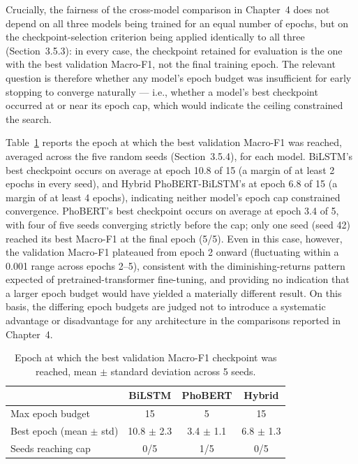 \documentclass[12pt]{report} %
\begin{document}
Crucially, the fairness of the cross-model comparison in Chapter~4 does not depend on all three models being trained for an equal number of epochs, but on the checkpoint-selection criterion being applied identically to all three (Section~3.5.3): in every case, the checkpoint retained for evaluation is the one with the best validation Macro-F1, not the final training epoch. The relevant question is therefore whether any model's epoch budget was insufficient for early stopping to converge naturally --- i.e., whether a model's best checkpoint occurred at or near its epoch cap, which would indicate the ceiling constrained the search.

Table~\ref{tab:epoch-convergence} reports the epoch at which the best validation Macro-F1 was reached, averaged across the five random seeds (Section~3.5.4), for each model. BiLSTM's best checkpoint occurs on average at epoch 10.8 of 15 (a margin of at least 2 epochs in every seed), and Hybrid PhoBERT-BiLSTM's at epoch 6.8 of 15 (a margin of at least 4 epochs), indicating neither model's epoch cap constrained convergence. PhoBERT's best checkpoint occurs on average at epoch 3.4 of 5, with four of five seeds converging strictly before the cap; only one seed (seed 42) reached its best Macro-F1 at the final epoch (5/5). Even in this case, however, the validation Macro-F1 plateaued from epoch 2 onward (fluctuating within a 0.001 range across epochs 2--5), consistent with the diminishing-returns pattern expected of pretrained-transformer fine-tuning, and providing no indication that a larger epoch budget would have yielded a materially different result. On this basis, the differing epoch budgets are judged not to introduce a systematic advantage or disadvantage for any architecture in the comparisons reported in Chapter~4.

\begin{table}[htbp]
    \centering
    \caption{Epoch at which the best validation Macro-F1 checkpoint was reached, mean $\pm$ standard deviation across 5 seeds.}
    \label{tab:epoch-convergence}
    \begin{tabular}{lccc}
        \hline
                                    & \textbf{BiLSTM} & \textbf{PhoBERT} & \textbf{Hybrid} \\
        \hline
        Max epoch budget            & 15              & 5                & 15              \\
        Best epoch (mean $\pm$ std) & 10.8 $\pm$ 2.3  & 3.4 $\pm$ 1.1    & 6.8 $\pm$ 1.3   \\
        Seeds reaching cap          & 0/5             & 1/5              & 0/5             \\
        \hline
    \end{tabular}
\end{table}
\end{document}

